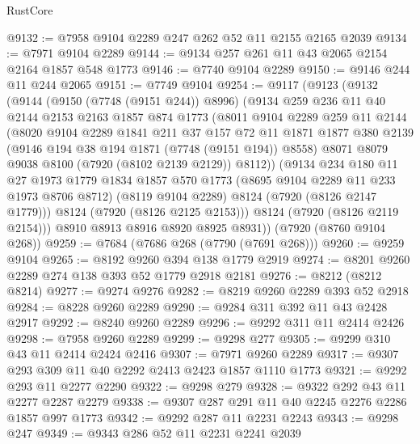 \begin{lexlean}{RustCore}
\begin{coremodule}
@9132 := @7958 @9104 @2289 @247 @262 @52 @11 @2155 @2165 @2039
@9134 := @7971 @9104 @2289
@9144 := @9134 @257 @261 @11 @43 @2065 @2154 @2164 @1857 @548 @1773
@9146 := @7740 @9104 @2289
@9150 := @9146 @244 @11 @244 @2065
@9151 := @7749 @9104
@9254 := @9117
    (@9123
      (@9132
        (@9144
          (@9150 (@7748 (@9151 @244)) @8996)
          (@9134
            @259
            @236
            @11
            @40
            @2144
            @2153
            @2163
            @1857
            @874
            @1773
            (@8011
              @9104
              @2289
              @259
              @11
              @2144
              (@8020
                @9104
                @2289
                @1841
                @211
                @37
                @157
                @72
                @11
                @1871
                @1877
                @380
                @2139
                (@9146 @194 @38 @194 @1871 (@7748 (@9151 @194)) @8558)
                @8071
                @8079
                @9038
                @8100
                (@7920 (@8102 @2139 @2129))
                @8112))
            (@9134
              @234
              @180
              @11
              @27
              @1973
              @1779
              @1834
              @1857
              @570
              @1773
              (@8695 @9104 @2289 @11 @233 @1973 @8706 @8712)
              (@8119 @9104 @2289)
              @8124
              (@7920 (@8126 @2147 @1779)))
            @8124
            (@7920 (@8126 @2125 @2153)))
          @8124
          (@7920 (@8126 @2119 @2154)))
        @8910
        @8913
        @8916
        @8920
        @8925
        @8931))
    (@7920 (@8760 @9104 @268))
@9259 := @7684 (@7686 @268 (@7790 (@7691 @268)))
@9260 := @9259 @9104
@9265 := @8192 @9260 @394 @138 @1779 @2919
@9274 := @8201 @9260 @2289 @274 @138 @393 @52 @1779 @2918 @2181
@9276 := @8212 (@8212 @8214)
@9277 := @9274 @9276
@9282 := @8219 @9260 @2289 @393 @52 @2918
@9284 := @8228 @9260 @2289
@9290 := @9284 @311 @392 @11 @43 @2428 @2917
@9292 := @8240 @9260 @2289
@9296 := @9292 @311 @11 @2414 @2426
@9298 := @7958 @9260 @2289
@9299 := @9298 @277
@9305 := @9299 @310 @43 @11 @2414 @2424 @2416
@9307 := @7971 @9260 @2289
@9317 := @9307 @293 @309 @11 @40 @2292 @2413 @2423 @1857 @1110 @1773
@9321 := @9292 @293 @11 @2277 @2290
@9322 := @9298 @279
@9328 := @9322 @292 @43 @11 @2277 @2287 @2279
@9338 := @9307 @287 @291 @11 @40 @2245 @2276 @2286 @1857 @997 @1773
@9342 := @9292 @287 @11 @2231 @2243
@9343 := @9298 @247
@9349 := @9343 @286 @52 @11 @2231 @2241 @2039

\end{coremodule}
\end{lexlean}
